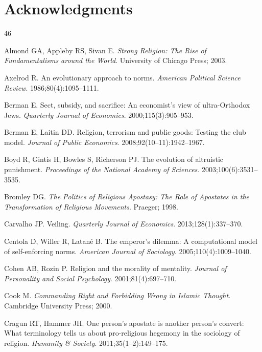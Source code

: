 \documentclass[12pt]{article}
\begin{document}
\section*{Acknowledgments}


\begin{thebibliography}{46}

Almond GA, Appleby RS, Sivan E.
\textit{Strong Religion: The Rise of Fundamentalisms around the World}.
University of Chicago Press; 2003.

Axelrod R.
An evolutionary approach to norms.
\textit{American Political Science Review}. 1986;80(4):1095--1111.

Berman E.
Sect, subsidy, and sacrifice: An economist's view of ultra-Orthodox Jews.
\textit{Quarterly Journal of Economics}. 2000;115(3):905--953.

Berman E, Laitin DD.
Religion, terrorism and public goods: Testing the club model.
\textit{Journal of Public Economics}. 2008;92(10--11):1942--1967.

Boyd R, Gintis H, Bowles S, Richerson PJ.
The evolution of altruistic punishment.
\textit{Proceedings of the National Academy of Sciences}. 2003;100(6):3531--3535.

Bromley DG.
\textit{The Politics of Religious Apostasy: The Role of Apostates in the Transformation of Religious Movements}.
Praeger; 1998.

Carvalho JP.
Veiling.
\textit{Quarterly Journal of Economics}. 2013;128(1):337--370.

Centola D, Willer R, Latan\'{e} B.
The emperor's dilemma: A computational model of self-enforcing norms.
\textit{American Journal of Sociology}. 2005;110(4):1009--1040.

Cohen AB, Rozin P.
Religion and the morality of mentality.
\textit{Journal of Personality and Social Psychology}. 2001;81(4):697--710.

Cook M.
\textit{Commanding Right and Forbidding Wrong in Islamic Thought}.
Cambridge University Press; 2000.

Cragun RT, Hammer JH.
One person's apostate is another person's convert: What terminology tells us about pro-religious hegemony in the sociology of religion.
\textit{Humanity \& Society}. 2011;35(1--2):149--175.


\end{thebibliography}
\end{document}
